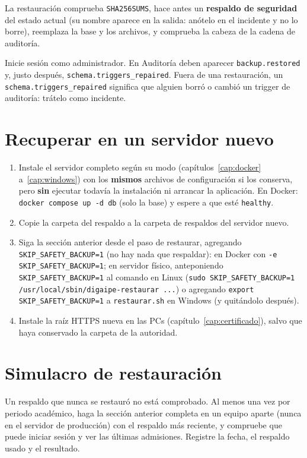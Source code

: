 La restauración comprueba \texttt{SHA256SUMS}, hace antes un \textbf{respaldo de seguridad} del
estado actual (su nombre aparece en la salida: anótelo en el incidente y no lo borre), reemplaza
la base y los archivos, y comprueba la cabeza de la cadena de auditoría.

\begin{comprobar}
	Inicie sesión como administrador. En Auditoría deben aparecer \texttt{backup.restored} y,
	justo después, \texttt{schema.triggers\_repaired}. Fuera de una restauración, un
	\texttt{schema.triggers\_repaired} significa que alguien borró o cambió un trigger de
	auditoría: trátelo como incidente.
\end{comprobar}

\section{Recuperar en un servidor nuevo}

\begin{enumerate}
	\item Instale el servidor completo según su modo (capítulos~\ref{cap:docker}
	      a~\ref{cap:windows}) con los \textbf{mismos} archivos de configuración si los conserva,
	      pero \textbf{sin} ejecutar todavía la instalación ni arrancar la aplicación.
	      En Docker: \texttt{docker compose up -d db} (solo la base) y espere a que esté
	      \texttt{healthy}.
	\item Copie la carpeta del respaldo a la carpeta de respaldos del servidor nuevo.
	\item Siga la sección anterior desde el paso de restaurar, agregando
	      \texttt{SKIP\_SAFETY\_BACKUP=1} (no hay nada que respaldar): en Docker con
	      \texttt{-e SKIP\_SAFETY\_BACKUP=1}; en servidor físico, anteponiendo
	      \texttt{SKIP\_SAFETY\_BACKUP=1} al comando en Linux
	      (\texttt{sudo SKIP\_SAFETY\_BACKUP=1 /usr/local/sbin/digaipe-restaurar ...}) o agregando
	      \texttt{export SKIP\_SAFETY\_BACKUP=1} a \texttt{restaurar.sh} en Windows (y quitándolo
	      después).
	\item Instale la raíz HTTPS nueva en las PCs (capítulo~\ref{cap:certificado}), salvo que haya
	      conservado la carpeta de la autoridad.
\end{enumerate}

\section{Simulacro de restauración}
\label{sec:simulacro}

Un respaldo que nunca se restauró no está comprobado. Al menos una vez por periodo académico,
haga la sección anterior completa en un equipo aparte (nunca en el servidor de producción) con
el respaldo más reciente, y compruebe que puede iniciar sesión y ver las últimas admisiones.
Registre la fecha, el respaldo usado y el resultado.
